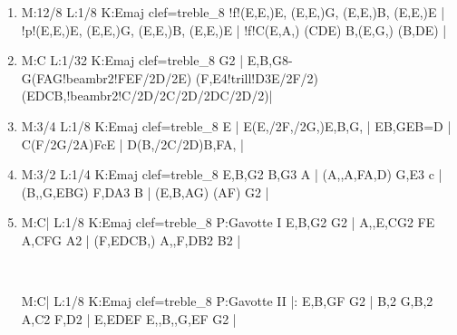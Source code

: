 \documentclass[a4paper,twoside]{article}
\begin{document}
%
%
\large
\settowidth{\titlelen}{Allemande}
\addtolength{\titlelen}{0.5em}
\setlength{\titleseplen}{1cm}
\begin{enumerate}
  \item {}
\begin{abcsvg}
  M:12/8
  L:1/8
  K:Emaj clef=treble_8
  !f!(E,E,)E, (E,E,)G, (E,E,)B, (E,E,)E |
  !p!(E,E,)E, (E,E,)G, (E,E,)B, (E,E,)E |
  !f!C(E,A,) (CDE) B,(E,G,) (B,DE) |
\end{abcsvg}
\makebox[2cm][l]{ \dotfill\ \pageref{VIprelude}}
\par\vspace{\titleseplen}

  \item {}
\begin{abcsvg}
  M:C
  L:1/32
  K:Emaj clef=treble_8
  G2 | {E,B,}G8- G(FAG!beambr2!FEF/2D/2E) ({F,}E4!trill!D3E/2F/2) (EDCB,!beambr2!C/2D/2C/2D/2DC/2D/2)|
\end{abcsvg}
\makebox[2cm][l]{ \dotfill\ \pageref{VIallemande}}
\par\vspace{\titleseplen}

  \item {}
\begin{abcsvg}
  M:3/4
  L:1/8
  K:Emaj clef=treble_8
  E | E(E,/2F,/2G,)E,B,G, |
  EB,GEB=D |
  C(F/2G/2A)FcE |
  D(B,/2C/2D)B,FA, |
\end{abcsvg}
\makebox[2cm][l]{ \dotfill\ \pageref{VIcourante}}
\par\vspace{\titleseplen}

  \item {}
\begin{abcsvg}
  M:3/2
  L:1/4
  K:Emaj clef=treble_8
  {E,B,}G2 {B,}G3 A |
  ({A,,A,}F{A,}D) {G,}E3 c |
  ({B,,G,E}BG) {F,D}A3 B |
  ({E,B,}AG) (AF) G2 |
\end{abcsvg}
\makebox[2cm][l]{ \dotfill\ \pageref{VIsarabande}}
\par\vspace{\titleseplen}

  \item {}
\begin{abcsvg}
  M:C|
  L:1/8
  K:Emaj clef=treble_8
  P:Gavotte I
  {E,B,}G2 G2 |
  {A,,E,C}G2 FE {A,C}FG A2 |
  ({F,}EDCB,) {A,,F,D}B2 B2 |
\end{abcsvg}
\\
\hspace*{\titlelen}
\begin{abcsvg}
  M:C|
  L:1/8
  K:Emaj clef=treble_8
  P:Gavotte II
  |: {E,B,}GF G2 |
  B,2 {G,}B,2 {A,}C2 {F,}D2 |
  {E,}EDEF {E,,B,,G,}EF G2 |
\end{abcsvg}
\makebox[2cm][l]{ \dotfill\ \pageref{VIgavottes}}
\par\vspace{\titleseplen}


\end{enumerate}
\end{document}
